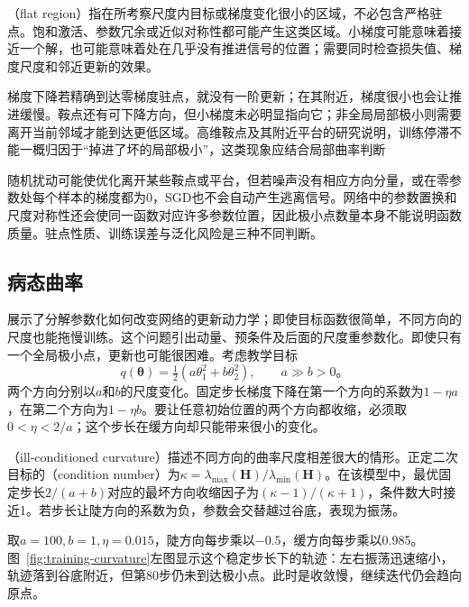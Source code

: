 （flat region）指在所考察尺度内目标或梯度变化很小的区域，不必包含严格驻点。饱和激活、参数冗余或近似对称性都可能产生这类区域。小梯度可能意味着接近一个解，也可能意味着处在几乎没有推进信号的位置；需要同时检查损失值、梯度尺度和邻近更新的效果。

梯度下降若精确到达零梯度驻点，就没有一阶更新；在其附近，梯度很小也会让推进缓慢。鞍点还有可下降方向，但小梯度未必明显指向它；非全局局部极小则需要离开当前邻域才能到达更低区域。高维鞍点及其附近平台的研究说明，训练停滞不能一概归因于“掉进了坏的局部极小”，这类现象应结合局部曲率判断

随机扰动可能使优化离开某些鞍点或平台，但若噪声没有相应方向分量，或在零参数处每个样本的梯度都为0，SGD也不会自动产生逃离信号。网络中的参数置换和尺度对称性还会使同一函数对应许多参数位置，因此极小点数量本身不能说明函数质量。驻点性质、训练误差与泛化风险是三种不同判断。

\subsection{病态曲率}
\label{sec:training-curvature}

展示了分解参数化如何改变网络的更新动力学；即使目标函数很简单，不同方向的尺度也能拖慢训练。这个问题引出动量、预条件及后面的尺度重参数化。即使只有一个全局极小点，更新也可能很困难。考虑教学目标
\begin{equation}
  q(\bm\theta)=\tfrac12(a\theta_1^2+b\theta_2^2),
  \qquad a\gg b>0\text{。}
  \label{eq:training-quadratic}
\end{equation}
两个方向分别以$a$和$b$的尺度变化。固定步长梯度下降在第一个方向的系数为$1-\eta a$，在第二个方向为$1-\eta b$。要让任意初始位置的两个方向都收缩，必须取$0<\eta<2/a$；这个步长在缓方向却只能带来很小的变化。

（ill-conditioned curvature）描述不同方向的曲率尺度相差很大的情形。正定二次目标的（condition number）为$\kappa=\lambda_{\max}(\bm H)/\lambda_{\min}(\bm H)$。在该模型中，最优固定步长$2/(a+b)$对应的最坏方向收缩因子为$(\kappa-1)/(\kappa+1)$，条件数大时接近1。若步长让陡方向的系数为负，参数会交替越过谷底，表现为振荡。

取$a=100,b=1,\eta=0.015$，陡方向每步乘以$-0.5$，缓方向每步乘以0.985。图~\ref{fig:training-curvature}左图显示这个稳定步长下的轨迹：左右振荡迅速缩小，轨迹落到谷底附近，但第80步仍未到达极小点。此时是收敛慢，继续迭代仍会趋向原点。

